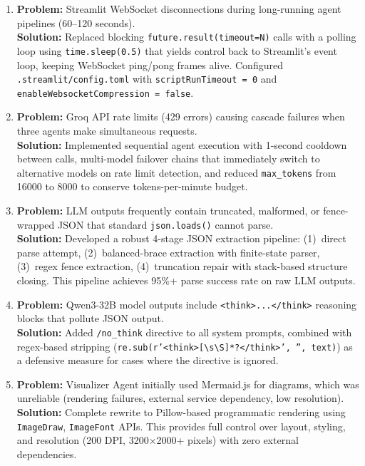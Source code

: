 \documentclass[a4paper,12pt,openany]{report}
\begin{document}
\begin{enumerate}[label=\arabic*., leftmargin=2cm]
\item \textbf{Problem:} Streamlit WebSocket disconnections during long-running agent pipelines (60--120 seconds).\\
\textbf{Solution:} Replaced blocking \texttt{future.result(timeout=N)} calls with a polling loop using \texttt{time.sleep(0.5)} that yields control back to Streamlit's event loop, keeping WebSocket ping/pong frames alive. Configured \texttt{.streamlit/config.toml} with \texttt{scriptRunTimeout = 0} and \texttt{enableWebsocketCompression = false}.

\item \textbf{Problem:} Groq API rate limits (429 errors) causing cascade failures when three agents make simultaneous requests.\\
\textbf{Solution:} Implemented sequential agent execution with 1-second cooldown between calls, multi-model failover chains that immediately switch to alternative models on rate limit detection, and reduced \texttt{max\_tokens} from 16000 to 8000 to conserve tokens-per-minute budget.

\item \textbf{Problem:} LLM outputs frequently contain truncated, malformed, or fence-wrapped JSON that standard \texttt{json.loads()} cannot parse.\\
\textbf{Solution:} Developed a robust 4-stage JSON extraction pipeline: (1)~direct parse attempt, (2)~balanced-brace extraction with finite-state parser, (3)~regex fence extraction, (4)~truncation repair with stack-based structure closing. This pipeline achieves 95\%+ parse success rate on raw LLM outputs.

\item \textbf{Problem:} Qwen3-32B model outputs include \texttt{<think>...</think>} reasoning blocks that pollute JSON output.\\
\textbf{Solution:} Added \texttt{/no\_think} directive to all system prompts, combined with regex-based stripping (\texttt{re.sub(r'<think>[\textbackslash{}s\textbackslash{}S]*?</think>', '', text)}) as a defensive measure for cases where the directive is ignored.

\item \textbf{Problem:} Visualizer Agent initially used Mermaid.js for diagrams, which was unreliable (rendering failures, external service dependency, low resolution).\\
\textbf{Solution:} Complete rewrite to Pillow-based programmatic rendering using \texttt{ImageDraw}, \texttt{ImageFont} APIs. This provides full control over layout, styling, and resolution (200 DPI, 3200$\times$2000+ pixels) with zero external dependencies.


\end{enumerate}
\end{document}
